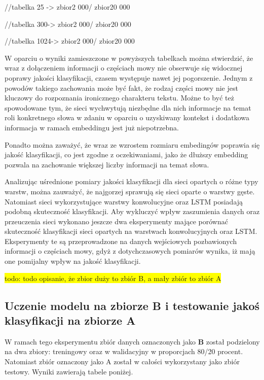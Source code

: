 //tabelka 25 -> zbior2 000/ zbior20 000

//tabelka 300-> zbior2 000/ zbior20 000

//tabelka 1024-> zbior2 000/ zbior20 000

W oparciu o wyniki zamieszczone w powyższych tabelkach można stwierdzić, że wraz z dołączeniem informacji o częściach mowy nie obserwuje się widocznej poprawy jakości klasyfikacji, czasem występuje nawet jej pogorszenie. Jednym z powodów takiego zachowania może być fakt, że rodzaj części mowy nie jest kluczowy do rozpoznania ironicznego charakteru tekstu. Możne to być też spowodowane tym, że sieci wychwytują niezbędne dla nich informacje na temat roli konkretnego słowa w zdaniu w oparciu o uzyskiwany kontekst i dodatkowa informacja w ramach embeddingu jest już niepotrzebna.

Ponadto można zaważyć, że wraz ze wzrostem rozmiaru embedingów poprawia się jakość klasyfikacji, co jest zgodne z oczekiwaniami, jako że dłuższy embedding pozwala na zachowanie większej liczby informacji na temat słowa.


Analizując uśrednione pomiary jakości klasyfikacji dla sieci opartych o różne typy warstw, można zauważyć, że najgorzej sprawują się sieci oparte o warstwy gęste. Natomiast sieci wykorzystujące warstwy konwolucyjne oraz LSTM posiadają podobną skuteczność klasyfikacji. Aby wykluczyć wpływ zaszumienia danych oraz przeuczenia sieci wykonano jeszcze dwa eksperymenty mające porównać skuteczność klasyfikacji sieci opartych na warstwach konwolucyjnych oraz LSTM. Eksperymenty te są przeprowadzone na danych wejściowych pozbawionych informacji o częściach mowy, gdyż z dotychczasowych pomiarów wynika, iż mają one pomijalny wpływ na jakość klasyfikacji.

\colorbox{yellow}{todo: todo opisanie, że zbior duży to zbiór B, a mały zbiór to zbiór A}\\
\subsection{Uczenie modelu na zbiorze B i testowanie jakoś klasyfikacji na zbiorze A }

W ramach tego eksperymentu zbiór danych oznaczonych jako \textbf{B} został podzielony na dwa zbiory: treningowy oraz w walidacyjny w proporcjach 80/20 procent. Natomiast zbiór oznaczony jako A został w całości wykorzystany jako zbiór testowy. Wyniki zawierają tabele poniżej.

